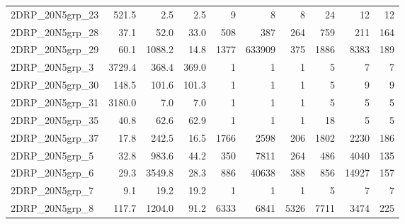 \documentclass[a4paper,10pt]{article}
\theoremstyle{definition}
\begin{document}
\begin{table}[t]
\begin{scriptsize}
\begin{tabular*}{\textwidth}{@{}l@{\;\;\extracolsep{\fill}}rrrrrrrrr@{}}
 2DRP\_20N5grp\_23 & \num{ 521.5} & \num{   2.5} & \num{   2.5} & \num{         9} & \num{         8} & \num{         8} & \num{        24} & \num{        12} & \num{        12}\\
 2DRP\_20N5grp\_28 & \num{  37.1} & \num{  52.0} & \num{  33.0} & \num{       508} & \num{       387} & \num{       264} & \num{       759} & \num{       211} & \num{       164}\\
 2DRP\_20N5grp\_29 & \num{  60.1} & \num{1088.2} & \num{  14.8} & \num{      1377} & \num{    633909} & \num{       375} & \num{      1886} & \num{      8383} & \num{       189}\\
  2DRP\_20N5grp\_3 & \num{3729.4} & \num{ 368.4} & \num{ 369.0} & \num{         1} & \num{         1} & \num{         1} & \num{         5} & \num{         7} & \num{         7}\\
 2DRP\_20N5grp\_30 & \num{ 148.5} & \num{ 101.6} & \num{ 101.3} & \num{         1} & \num{         1} & \num{         1} & \num{         5} & \num{         9} & \num{         9}\\
 2DRP\_20N5grp\_31 & \num{3180.0} & \num{   7.0} & \num{   7.0} & \num{         1} & \num{         1} & \num{         1} & \num{         5} & \num{         5} & \num{         5}\\
 2DRP\_20N5grp\_35 & \num{  40.8} & \num{  62.6} & \num{  62.9} & \num{         1} & \num{         1} & \num{         1} & \num{        18} & \num{         5} & \num{         5}\\
 2DRP\_20N5grp\_37 & \num{  17.8} & \num{ 242.5} & \num{  16.5} & \num{      1766} & \num{      2598} & \num{       206} & \num{      1802} & \num{      2230} & \num{       186}\\
  2DRP\_20N5grp\_5 & \num{  32.8} & \num{ 983.6} & \num{  44.2} & \num{       350} & \num{      7811} & \num{       264} & \num{       486} & \num{      4040} & \num{       135}\\
  2DRP\_20N5grp\_6 & \num{  29.3} & \num{3549.8} & \num{  28.3} & \num{       886} & \num{     40638} & \num{       388} & \num{       856} & \num{     14927} & \num{       157}\\
  2DRP\_20N5grp\_7 & \num{   9.1} & \num{  19.2} & \num{  19.2} & \num{         1} & \num{         1} & \num{         1} & \num{         5} & \num{         7} & \num{         7}\\
  2DRP\_20N5grp\_8 & \num{ 117.7} & \num{1204.0} & \num{  91.2} & \num{      6333} & \num{      6841} & \num{      5326} & \num{      7711} & \num{      3474} & \num{       225}\\

\end{tabular*}
\end{scriptsize}
\end{table}
\end{document}
